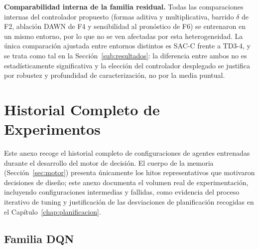 \documentclass[12pt, a4paper, twoside]{report}
\begin{document}
\textbf{Comparabilidad interna de la familia residual.} Todas las
comparaciones internas del controlador propuesto (formas aditiva y
multiplicativa, barrido $\delta$ de F2, ablación DAWN de F4 y sensibilidad al
pronóstico de F6) se entrenaron en un mismo entorno, por lo que no se ven
afectadas por esta heterogeneidad. La única comparación ajustada entre
entornos distintos es SAC-C frente a TD3-4, y se trata como tal en la
Sección~\ref{sub:resultados}: la diferencia entre ambos no es
estadísticamente significativa y la elección del controlador desplegado se
justifica por robustez y profundidad de caracterización, no por la media
puntual.

\chapter{Historial Completo de Experimentos}
\label{app:historial}

Este anexo recoge el historial completo de configuraciones de agentes
entrenadas durante el desarrollo del motor de decisión. El cuerpo de la memoria
(Sección~\ref{sec:motor}) presenta únicamente los hitos representativos que
motivaron decisiones de diseño; este anexo documenta el volumen real de
experimentación, incluyendo configuraciones intermedias y fallidas, como
evidencia del proceso iterativo de tuning y justificación de las desviaciones
de planificación recogidas en el Capítulo~\ref{chap:planificacion}.

\section{Familia DQN}
\end{document}

